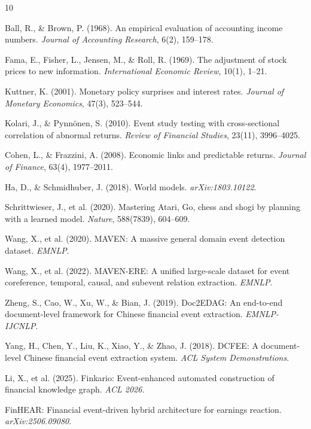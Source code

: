 \documentclass[sigconf, anonymous, review]{acmart}
\begin{document}

\begin{thebibliography}{10}

Ball, R., \& Brown, P. (1968). An empirical evaluation of accounting income numbers. \emph{Journal of Accounting Research}, 6(2), 159--178.

Fama, E., Fisher, L., Jensen, M., \& Roll, R. (1969). The adjustment of stock prices to new information. \emph{International Economic Review}, 10(1), 1--21.

Kuttner, K. (2001). Monetary policy surprises and interest rates. \emph{Journal of Monetary Economics}, 47(3), 523--544.

Kolari, J., \& Pynn\"onen, S. (2010). Event study testing with cross-sectional correlation of abnormal returns. \emph{Review of Financial Studies}, 23(11), 3996--4025.

Cohen, L., \& Frazzini, A. (2008). Economic links and predictable returns. \emph{Journal of Finance}, 63(4), 1977--2011.

Ha, D., \& Schmidhuber, J. (2018). World models. \emph{arXiv:1803.10122}.

Schrittwieser, J., et al. (2020). Mastering Atari, Go, chess and shogi by planning with a learned model. \emph{Nature}, 588(7839), 604--609.

Wang, X., et al. (2020). MAVEN: A massive general domain event detection dataset. \emph{EMNLP}.

Wang, X., et al. (2022). MAVEN-ERE: A unified large-scale dataset for event coreference, temporal, causal, and subevent relation extraction. \emph{EMNLP}.

Zheng, S., Cao, W., Xu, W., \& Bian, J. (2019). Doc2EDAG: An end-to-end document-level framework for Chinese financial event extraction. \emph{EMNLP-IJCNLP}.

Yang, H., Chen, Y., Liu, K., Xiao, Y., \& Zhao, J. (2018). DCFEE: A document-level Chinese financial event extraction system. \emph{ACL System Demonstrations}.

Li, X., et al. (2025). Finkario: Event-enhanced automated construction of financial knowledge graph. \emph{ACL 2026}.

FinHEAR: Financial event-driven hybrid architecture for earnings reaction. \emph{arXiv:2506.09080}.


\end{thebibliography}
\end{document}
